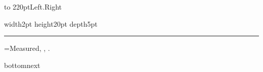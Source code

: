 \documentclass{article}
\begin{document}
\noindent{}
\par\noindent\hbox to 220pt{Left\leaders\hbox{.}\hfill Right}
\par\noindent\vrule width2pt height20pt depth5pt\kern10pt\rule[-3pt]{100pt}{2pt}
=\hbox{Measured}\the{}, \the{}, \the{}.
\par\noindent{}\quad\vbox{\hbox{bottom}\hbox{next}}
\end{document}

